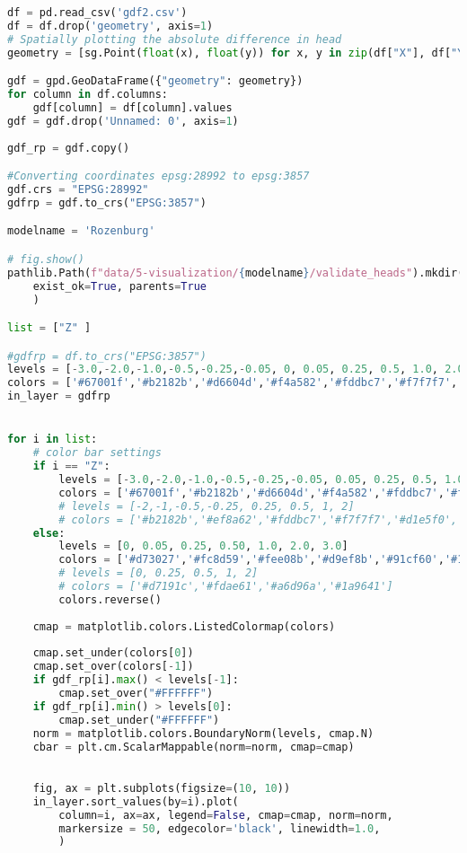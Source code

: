 \begin{lstlisting}[language=Python]
df = pd.read_csv('gdf2.csv')
df = df.drop('geometry', axis=1)
# Spatially plotting the absolute difference in head
geometry = [sg.Point(float(x), float(y)) for x, y in zip(df["X"], df["Y"])]

gdf = gpd.GeoDataFrame({"geometry": geometry})
for column in df.columns:
    gdf[column] = df[column].values
gdf = gdf.drop('Unnamed: 0', axis=1)
   
gdf_rp = gdf.copy()

#Converting coordinates epsg:28992 to epsg:3857
gdf.crs = "EPSG:28992"
gdfrp = gdf.to_crs("EPSG:3857")

modelname = 'Rozenburg'

# fig.show()
pathlib.Path(f"data/5-visualization/{modelname}/validate_heads").mkdir(
    exist_ok=True, parents=True
    )

list = ["Z" ]

#gdfrp = df.to_crs("EPSG:3857")
levels = [-3.0,-2.0,-1.0,-0.5,-0.25,-0.05, 0, 0.05, 0.25, 0.5, 1.0, 2.0, 3.0]
colors = ['#67001f','#b2182b','#d6604d','#f4a582','#fddbc7','#f7f7f7','#d1e5f0','#92c5de','#4393c3','#2166ac','#053061']
in_layer = gdfrp


for i in list:
    # color bar settings
    if i == "Z":
        levels = [-3.0,-2.0,-1.0,-0.5,-0.25,-0.05, 0.05, 0.25, 0.5, 1.0, 2.0, 3.0]
        colors = ['#67001f','#b2182b','#d6604d','#f4a582','#fddbc7','#f7f7f7','#d1e5f0','#92c5de','#4393c3','#2166ac','#053061']
        # levels = [-2,-1,-0.5,-0.25, 0.25, 0.5, 1, 2]
        # colors = ['#b2182b','#ef8a62','#fddbc7','#f7f7f7','#d1e5f0','#67a9cf','#2166ac']
    else:
        levels = [0, 0.05, 0.25, 0.50, 1.0, 2.0, 3.0]
        colors = ['#d73027','#fc8d59','#fee08b','#d9ef8b','#91cf60','#1a9850']
        # levels = [0, 0.25, 0.5, 1, 2]
        # colors = ['#d7191c','#fdae61','#a6d96a','#1a9641']
        colors.reverse()
                
    cmap = matplotlib.colors.ListedColormap(colors)     
        
    cmap.set_under(colors[0])
    cmap.set_over(colors[-1])
    if gdf_rp[i].max() < levels[-1]:
        cmap.set_over("#FFFFFF")
    if gdf_rp[i].min() > levels[0]:
        cmap.set_under("#FFFFFF")
    norm = matplotlib.colors.BoundaryNorm(levels, cmap.N)
    cbar = plt.cm.ScalarMappable(norm=norm, cmap=cmap)

       
    fig, ax = plt.subplots(figsize=(10, 10))
    in_layer.sort_values(by=i).plot(
        column=i, ax=ax, legend=False, cmap=cmap, norm=norm,
        markersize = 50, edgecolor='black', linewidth=1.0,
        )


\end{lstlisting}
